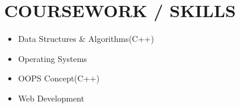\documentclass[letterpaper,11pt]{article}
\makeatletter
\newcommand{\resumeItem}[1]{
  \item\small{
    {#1 \vspace{-3pt}}
  }
}
\newcommand{\resumeProjectHeading}[2]{
    \item
    \begin{tabular*}{1.001\textwidth}{l@{\extracolsep{\fill}}r}
      \small#1 & \textbf{\small #2}\\
    \end{tabular*}\vspace{-9pt}
}
\newcommand{\resumeSubHeadingListStart}{\begin{itemize}[leftmargin=0.0in, label={}]}
\newcommand{\resumeSubHeadingListEnd}{\end{itemize}}
\newcommand{\resumeItemListStart}{\begin{itemize}}
\newcommand{\resumeItemListEnd}{\end{itemize}\vspace{-5pt}}
\makeatother
\begin{document}
\section{COURSEWORK / SKILLS}
        \begin{multicols}{4}
            \begin{itemize}[itemsep=-2pt, parsep=5pt]
                \item Data Structures \& Algorithms(C++)
                \item Operating Systems
               
                \item OOPS Concept(C++)
                \item Web Development
                
            \end{itemize}
        \end{multicols}
        \vspace*{2.0\multicolsep}








         
         
\end{document}
